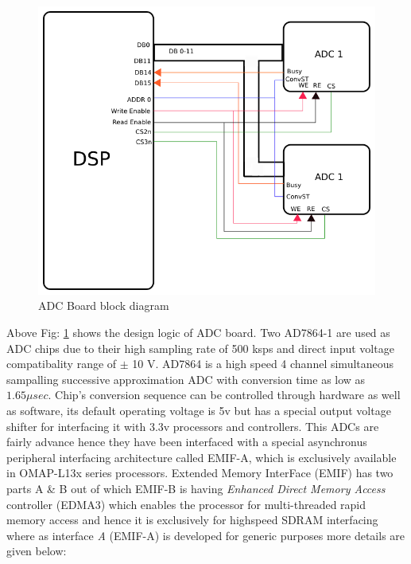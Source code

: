\begin{figure}[ht]
\includegraphics[width=\columnwidth]{fig/ADC_board.png}
\caption{ADC Board block diagram}
\label{fig:adc_board}
\end{figure}
Above Fig: \ref{fig:adc_board} shows the design logic of ADC board. Two AD7864-1 are used as ADC chips due to their high sampling rate of 500 ksps and direct input voltage compatibality range of $\pm$ 10 V. AD7864 is a high speed 4 channel simultaneous sampalling successive approximation ADC with conversion time as low as $1.65 \mu sec$. Chip's conversion sequence can be controlled through hardware as well as software, its default operating voltage is 5v but has a special output voltage shifter for interfacing it with 3.3v processors and controllers. This ADCs are fairly advance hence they have been interfaced with a special asynchronus peripheral interfacing architecture called EMIF-A, which is exclusively available in OMAP-L13x series processors. Extended Memory InterFace (EMIF) has two parts A \& B out of which EMIF-B is having \textit{Enhanced Direct Memory Access} controller (EDMA3) which enables the processor for multi-threaded rapid memory access and hence it is exclusively for highspeed SDRAM interfacing where as interface \textit{A} (EMIF-A) is developed for generic purposes more details are given below:

